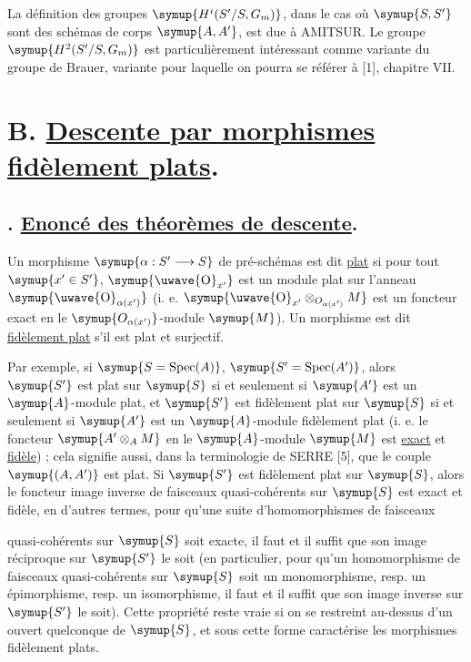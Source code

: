  La définition des groupes $\symup{H^i(S'/S,G_m)}$, dans le cas où
$\symup{S,S'}$ sont des schémas de corps $\symup{A,A'}$, est due à AMITSUR. Le groupe
$\symup{H^2(S'/S,G_m)}$ est particulièrement intéressant comme variante 
du groupe de Brauer, variante pour laquelle on pourra se référer à [1],
chapitre VII.

\section*{\normalfont B. \uline{Descente par morphismes fidèlement plats}.}

\subsection*{. \uline{Enoncé des théorèmes de descente}.}

 Un morphisme
$\symup{\alpha:S'\longrightarrow S}$ de pré-schémas est dit \uline{plat} si pour tout
$\symup{x'\in S'}$, $\symup{\text{\uwave{O}}_{x'}}$ est un module plat sur l'anneau
$\symup{\text{\uwave{O}}_{\alpha(x')}}$ (i. e.
$\symup{\text{\uwave{O}}_{x'}\otimes_{O_{\alpha(x')}}M}$ est un foncteur exact en
le $\symup{O_{\alpha(x')}}$-module $\symup{M}$). Un morphisme est dit
\uline{fidèlement plat} s'il est plat et surjectif.

Par exemple, si $\symup{S=\operatorname{Spec}(A)}$,
$\symup{S'=\operatorname{Spec}(A')}$, alors $\symup{S'}$ est plat sur $\symup{S}$ si et seulement si
$\symup{A'}$ est un $\symup{A}$-module plat, et $\symup{S'}$ est fidèlement plat sur $\symup{S}$ si et
seulement si $\symup{A'}$ est un $\symup{A}$-module fidèlement plat (i. e. le foncteur
$\symup{A'\otimes_A M}$ en le $\symup{A}$-module $\symup{M}$ est \uline{exact} et \uline{fidèle}) ; cela signifie
aussi, dans la terminologie de SERRE [5], que le couple $\symup{(A,A')}$ est plat. Si
$\symup{S'}$ est fidèlement plat sur $\symup{S}$, alors le foncteur image inverse de faisceaux
quasi-cohérents sur $\symup{S}$ est exact et fidèle, en d'autres termes, pour qu'une
suite d'homomorphismes de faisceaux

quasi-cohérents sur $\symup{S}$ soit exacte, il faut et il suffit que son image
réciproque sur $\symup{S'}$ le soit (en particulier, pour qu'un homomorphisme de
faisceaux quasi-cohérents sur $\symup{S}$ soit un monomorphisme, resp. un
épimorphisme, resp. un isomorphisme, il faut et il suffit que son image inverse
sur $\symup{S'}$ le soit). Cette propriété reste vraie si on se restreint au-dessus
d'un ouvert quelconque de $\symup{S}$, et sous cette forme caractérise les morphismes
fidèlement plats.

